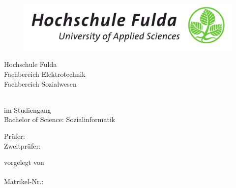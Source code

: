 \begin{titlepage}
\begin{figure}
  \centering
  \includegraphics[width=1.0\textwidth]{res/hs_fulda_logo_ntr.jpg}
\end{figure}
    \centering
    Hochschule Fulda \\    Fachbereich Elektrotechnik \\ Fachbereich Sozialwesen
    \vspace{1.5cm}

    {\Huge \bfseries \titel \par}
    {\Large \itshape \untertitel \par}
    \vspace{2.5cm}

    
    \modulname\\
    im Studiengang\\ Bachelor of Science: Sozialinformatik \\
    \vspace{0.7cm}


    \vspace{3cm}
    Prüfer: \pruefer\\
    Zweitprüfer: \zweitpruefer\\

    \vfill

    vorgelegt von \\ \vorname \nachname \\ Matrikel-Nr.: \matrikelnummer \\ \emailadresse \\ %
\restoregeometry
\end{titlepage}
